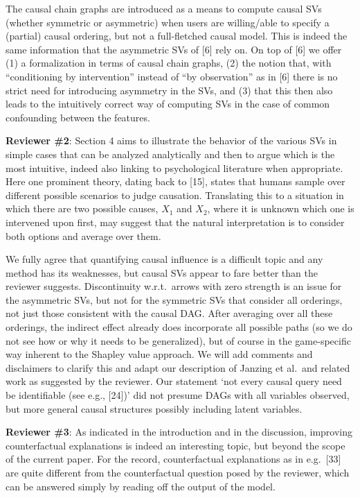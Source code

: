 \documentclass{article}
\begin{document}
The causal chain graphs are introduced as a means to compute causal SVs (whether symmetric or asymmetric) when users are willing/able to specify a (partial) causal ordering, but not a full-fletched causal model. This is indeed the same information that the asymmetric SVs of [6] rely on. On top of [6] we offer (1) a formalization in terms of causal chain graphs, (2) the notion that, with ``conditioning by intervention'' instead of ``by observation'' as in [6] there is no strict need for introducing asymmetry in the SVs, and (3) that this then also leads to the intuitively correct way of computing SVs in the case of common confounding between the features.

{\bf Reviewer \#2}: Section 4 aims to illustrate the behavior of the various SVs in simple cases that can be analyzed analytically and then to argue which is the most intuitive, indeed also linking to psychological literature when appropriate. Here one prominent theory, dating back to [15], states that humans sample over different possible scenarios to judge causation. Translating this to a situation in which there are two possible causes, $X_1$ and $X_2$, where it is unknown which one is intervened upon first, may suggest that the natural interpretation is to consider both options and average over them.

We fully agree that quantifying causal influence is a difficult topic and any method has its weaknesses, but causal SVs appear to fare better than the reviewer suggests. Discontinuity w.r.t.\ arrows with zero strength is an issue for the asymmetric SVs, but not for the symmetric SVs that consider all orderings, not just those consistent with the causal DAG. After averaging over all these orderings, the indirect effect already does incorporate all possible paths (so we do not see how or why it needs to be generalized), but of course in the game-specific way inherent to the Shapley value approach. We will add comments and disclaimers to clarify this and adapt our description of Janzing et al.\ and related work as suggested by the reviewer. Our statement `not every causal query need be identifiable (see e.g., [24])' did not presume DAGs with all variables observed, but more general causal structures possibly including latent variables.

{\bf Reviewer \#3}: As indicated in the introduction and in the discussion, improving  counterfactual explanations is indeed an interesting topic, but beyond the scope of the current paper. For the record, counterfactual explanations as in e.g.~[33] are quite different from the counterfactual question posed by the reviewer, which can be answered simply by reading off the output of the model.
\end{document}
